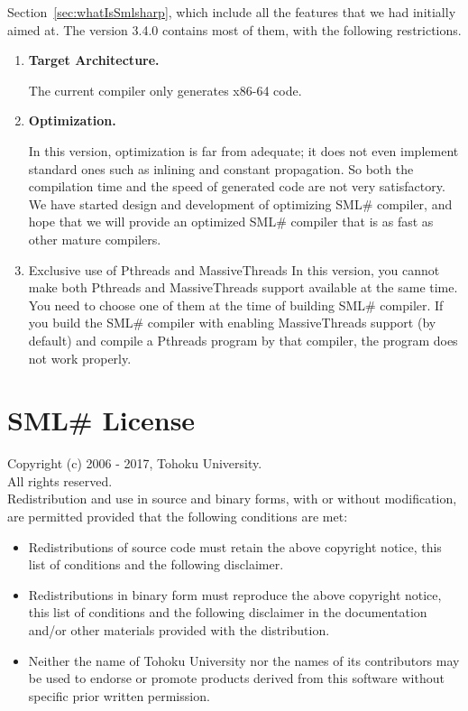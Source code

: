 \documentclass{jbook}
\newcommand{\txt}[2]{#2}
\newcommand{\smlsharp}{SML\#}
\newcommand{\version}{3.4.0}
\begin{document}
Section~\ref{sec:whatIsSmlsharp}, which include all the features that we
had initially aimed at. 
	The version \version{} contains most of them, with the following 
restrictions.
\begin{enumerate}
\item {\bf Target Architecture.}

	The current compiler only generates x86-64 code.

\item {\bf Optimization.}

	In this version, optimization is far from adequate; it does not
even implement standard ones such as inlining and constant propagation.
	So both the compilation time and the speed of generated code are
not very satisfactory.
	We have started design and development of optimizing \smlsharp{}
compiler, and hope that we will provide an optimized \smlsharp{}
compiler that is as fast as other mature compilers.

\item {Exclusive use of Pthreads and MassiveThreads}
	In this version, you cannot make both Pthreads and MassiveThreads
support available at the same time.
	You need to choose one of them at the time of building
\smlsharp{} compiler.
	If you build the \smlsharp{} compiler with enabling MassiveThreads
support (by default) and compile a Pthreads program by that compiler,
the program does not work properly.

\end{enumerate}
\fi%

\chapter{\txt{\smlsharp{}ライセンス}{\smlsharp{} License}}
\label{sec:smlsharpLicence}

Copyright (c) 2006 - 2017, Tohoku University.\\
All rights reserved.\\

Redistribution and use in source and binary forms, with or without
modification, are permitted provided that the following conditions are
met:

\begin{itemize}
\item 
  Redistributions of source code must retain the above copyright
  notice, this list of conditions and the following disclaimer. 
\item 
  Redistributions in binary form must reproduce the above
  copyright notice, this list of conditions and the following disclaimer
  in the documentation and/or other materials provided with the
  distribution. 
\item 
  Neither the name of Tohoku University nor the names of its
  contributors may be used to endorse or promote products derived from
  this software without specific prior written permission.  
\end{itemize}
\end{document}
